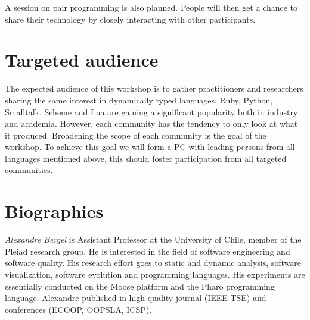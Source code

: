 \documentclass[runningheads]{llncs}
\newcommand\AK[1]{\nb{akuhn}{#1}}
\begin{document}
A session on pair programming is also planned. People will then get a chance to share their technology by closely interacting with other participants. 


\section{Targeted audience}

The expected audience of this workshop is to gather practitioners and researchers sharing the same interest in dynamically typed languages. Ruby, Python, Smalltalk, Scheme and Lua are gaining a significant popularity both in industry and academia. However, each community has the tendency to only look at what it produced. Broadening the scope of each community is the goal of the workshop. To achieve this goal we will form a PC with leading persons from all languages mentioned above, this should foster participation from all targeted communities.


\section{Biographies}

\noindent \emph{Alexandre Bergel} is Assistant Professor at the University of Chile, member of the Pleiad research group. He is interested in the field of software engineering and software quality. His research effort goes to static and dynamic analysis, software visualization, software evolution and programming languages. His experiments are essentially conducted on the Moose platform and the Pharo programming language. Alexandre published in high-quality journal (IEEE TSE) and conferences (ECOOP, OOPSLA, ICSP).\\

\end{document}
